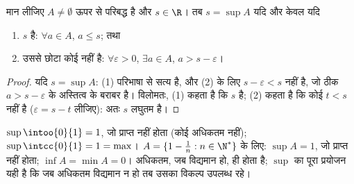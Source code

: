\begin{proposition}[$\varepsilon$-अभिलक्षण]\label{prop:b1:reals:epsilon}
मान लीजिए $A \neq \emptyset$ ऊपर से परिबद्ध है और $s \in \R$। तब $s = \sup
A$ यदि और केवल यदि
\begin{enumerate}
  \item $s$  है: $\forall a \in A$, $a \leq s$; तथा
  \item उससे छोटा कोई नहीं है: $\forall \varepsilon > 0$, $\exists a \in A$,
  $a > s - \varepsilon$।
\end{enumerate}
\end{proposition}

\begin{proof}
यदि $s = \sup A$: (1) परिभाषा से सत्य है, और (2) के लिए $s - \varepsilon <
s$  नहीं है, जो ठीक $a > s - \varepsilon$ के अस्तित्व के बराबर
है। विलोमतः, (1) कहता है कि $s$  है; (2) कहता है कि कोई $t < s$
 नहीं है ($\varepsilon = s - t$ लीजिए): अतः $s$ लघुतम है।
\end{proof}

\begin{example}\label{ex:b1:reals:supexamples}
$\sup \intoo{0}{1} = 1$, जो प्राप्त नहीं होता (कोई अधिकतम नहीं); $\sup
\intcc{0}{1} = 1 = \max$। $A = \{1 - \frac 1n : n \in \N^*\}$ के लिए: $\sup
A = 1$, जो प्राप्त नहीं होता; $\inf A = \min A = 0$। अधिकतम, जब विद्यमान हो,
 ही होता है; $\sup$ का पूरा प्रयोजन यही है कि जब अधिकतम विद्यमान न हो
तब उसका विकल्प उपलब्ध रहे।
\end{example}

